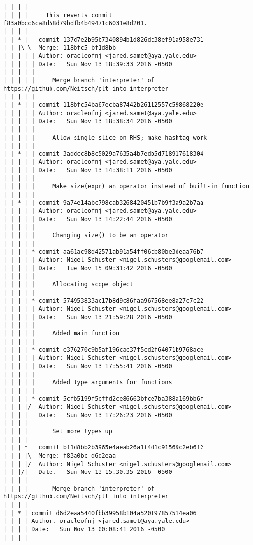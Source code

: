 \begin{lstlisting}
| | | |     
| | | |     This reverts commit f83a0bcc6ca8d58d79bdfb4b49471c6031e8d201.
| | | |       
| | * |   commit 137d7e2b95b7340894b1d826dc38ef91a958e731
| | |\ \  Merge: 118bfc5 bf1d8bb
| | | | | Author: oracleofnj <jared.samet@aya.yale.edu>
| | | | | Date:   Sun Nov 13 18:39:33 2016 -0500
| | | | | 
| | | | |     Merge branch 'interpreter' of https://github.com/Neitsch/plt into interpreter
| | | | |      
| | * | | commit 118bfc54ba67ecba87442b26112557c59868220e
| | | | | Author: oracleofnj <jared.samet@aya.yale.edu>
| | | | | Date:   Sun Nov 13 18:38:34 2016 -0500
| | | | | 
| | | | |     Allow single slice on RHS; make hashtag work
| | | | |      
| | * | | commit 3addcc8b8c5029a7635a4b7edb5d718917618304
| | | | | Author: oracleofnj <jared.samet@aya.yale.edu>
| | | | | Date:   Sun Nov 13 14:38:11 2016 -0500
| | | | | 
| | | | |     Make size(expr) an operator instead of built-in function
| | | | |      
| | * | | commit 9a74e14abc798cab3268420451b7b9f3a9a2b7aa
| | | | | Author: oracleofnj <jared.samet@aya.yale.edu>
| | | | | Date:   Sun Nov 13 14:22:44 2016 -0500
| | | | | 
| | | | |     Changing size() to be an operator
| | | | |      
| | | | * commit aa61ac98d42571ab91a54ff06cb80be3deaa76b7
| | | | | Author: Nigel Schuster <nigel.schusters@googlemail.com>
| | | | | Date:   Tue Nov 15 09:31:42 2016 -0500
| | | | | 
| | | | |     Allocating scope object
| | | | |      
| | | | * commit 574953833ac17b8d9c86faa967568ee8a27c7c22
| | | | | Author: Nigel Schuster <nigel.schusters@googlemail.com>
| | | | | Date:   Sun Nov 13 21:59:28 2016 -0500
| | | | | 
| | | | |     Added main function
| | | | |      
| | | | * commit e376270c9b5af196cac37f5cd2f64071b9768ace
| | | | | Author: Nigel Schuster <nigel.schusters@googlemail.com>
| | | | | Date:   Sun Nov 13 17:55:41 2016 -0500
| | | | | 
| | | | |     Added type arguments for functions
| | | | |      
| | | | * commit 5cfb5199f5effd2ce86663bfce7ba388a169bb6f
| | | |/  Author: Nigel Schuster <nigel.schusters@googlemail.com>
| | | |   Date:   Sun Nov 13 17:26:23 2016 -0500
| | | |   
| | | |       Set more types up
| | | |       
| | | *   commit bf1d8bb2b3965e4aeab26a1f4d1c91569c2eb6f2
| | | |\  Merge: f83a0bc d6d2eaa
| | | |/  Author: Nigel Schuster <nigel.schusters@googlemail.com>
| | |/|   Date:   Sun Nov 13 15:30:35 2016 -0500
| | | |   
| | | |       Merge branch 'interpreter' of https://github.com/Neitsch/plt into interpreter
| | | |     
| | * | commit d6d2eaa5440fbb39958b104a520197857514ea06
| | | | Author: oracleofnj <jared.samet@aya.yale.edu>
| | | | Date:   Sun Nov 13 00:08:41 2016 -0500
| | | | 

\end{lstlisting}
